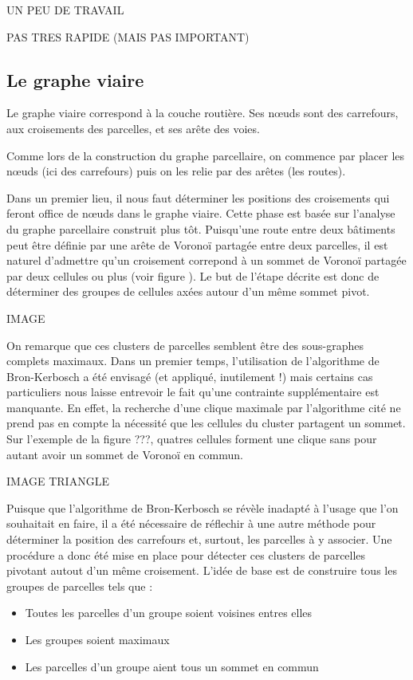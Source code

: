 \documentclass[10pt]{article}
\begin{document}
UN PEU DE TRAVAIL

PAS TRES RAPIDE (MAIS PAS IMPORTANT)

\subsection{Le graphe viaire}

Le graphe viaire correspond à la couche routière. Ses n\oe uds sont
des carrefours, aux croisements des parcelles, et ses arête des voies.

Comme lors de la construction du graphe parcellaire, on commence par
placer les n\oe uds (ici des carrefours) puis on les relie par des
arêtes (les routes).

Dans un premier lieu, il nous faut déterminer les positions des
croisements qui feront office de n\oe uds dans le graphe viaire. Cette
phase est basée sur l'analyse du graphe parcellaire construit plus
tôt. Puisqu'une route entre deux bâtiments peut être définie par une
arête de Voronoï partagée entre deux parcelles, il est naturel
d'admettre qu'un croisement correpond à un sommet de Voronoï partagée
par deux cellules ou plus (voir figure ). Le but de l'étape décrite
est donc de déterminer des groupes de cellules axées autour d'un même
sommet pivot.

IMAGE

On remarque que ces clusters de parcelles semblent être des
sous-graphes complets maximaux. Dans un premier temps, l'utilisation
de l'algorithme de Bron-Kerbosch a été envisagé (et appliqué,
inutilement !) mais certains cas particuliers nous laisse entrevoir
le fait qu'une contrainte supplémentaire est manquante. En effet, la
recherche d'une clique maximale par l'algorithme cité ne prend pas en
compte la nécessité que les cellules du cluster partagent un
sommet. Sur l'exemple de la figure ???, quatres cellules forment une
clique sans pour autant avoir un sommet de Voronoï en commun.

IMAGE TRIANGLE

Puisque que l'algorithme de Bron-Kerbosch se révèle inadapté à l'usage
que l'on souhaitait en faire, il a été nécessaire de réflechir à une
autre méthode pour déterminer la position des carrefours et, surtout,
les parcelles à y associer. Une procédure a donc été mise en place
pour détecter ces clusters de parcelles pivotant autout d'un même
croisement. L'idée de base est de construire tous les groupes de
parcelles tels que :

\begin{itemize}
\item{Toutes les parcelles d'un groupe soient voisines entres elles}
\item{Les groupes soient maximaux}
\item{Les parcelles d'un groupe aient tous un sommet en commun}
\end{itemize}
\end{document}
